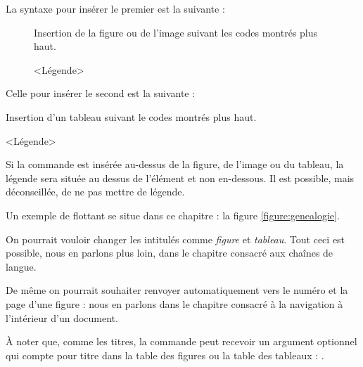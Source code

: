La syntaxe pour insérer le premier est la suivante :

\begin{latexcode}
\begin{figure}[<paramètre de placement>]
    Insertion de la figure ou de l'image suivant les codes montrés plus haut.
    \caption{<Légende>}
\end{figure} 
\end{latexcode}

Celle pour insérer le second est la suivante :

\begin{latexcode}
\begin{table}[<paramètre de placement>]
    Insertion d'un tableau suivant le codes montrés plus haut.
    \caption{<Légende>}
\end{table} 
\end{latexcode}

Si la commande  est insérée au-dessus de la figure, de l'image ou du tableau, la légende sera située au dessus de l'élément et non en-dessous. Il est possible, mais déconseillée, de ne pas mettre de légende.

Un exemple de flottant se situe  dans ce chapitre : la figure \ref{figure:genealogie}.
\begin{attention}
    On pourrait vouloir changer les intitulés comme \emph{figure} et \emph{tableau}. Tout ceci est possible, nous en parlons plus loin, dans le chapitre consacré aux chaînes de langue.
    
    De même on pourrait souhaiter renvoyer automatiquement vers le numéro et la page d'une figure : nous en parlons dans le chapitre consacré à la navigation à l'intérieur d'un document.
\end{attention}

À noter que, comme les titres, la commande  peut recevoir un argument optionnel qui compte pour titre dans la table des figures ou la table des tableaux :
.


